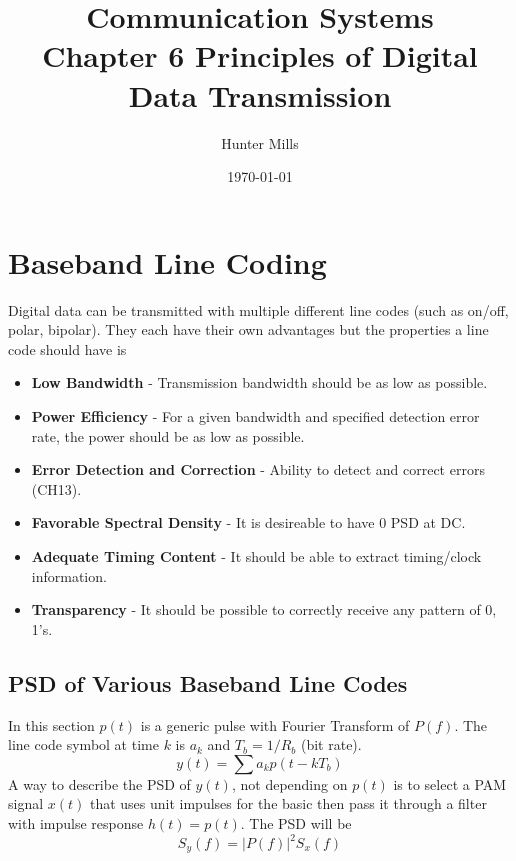 \documentclass{article}
\title{Communication Systems \\
    \large Chapter 6 Principles of Digital Data Transmission }
\author{Hunter Mills}
\date{\today}
\begin{document}
    \maketitle

    \medskip
        
    \section{Baseband Line Coding}
    Digital data can be transmitted with multiple different line codes (such as on/off, polar, bipolar). They each have their own
    advantages but the properties a line code should have is
    \begin{itemize}
        \item \textbf{Low Bandwidth}    - Transmission bandwidth should be as low as possible.
        \item \textbf{Power Efficiency} - For a given bandwidth and specified detection error rate, the power should be as low as possible.
        \item \textbf{Error Detection and Correction} - Ability to detect and correct errors (CH13).
        \item \textbf{Favorable Spectral Density} - It is desireable to have 0 PSD at DC.
        \item \textbf{Adequate Timing Content} - It should be able to extract timing/clock information.
        \item \textbf{Transparency} - It should be possible to correctly receive any pattern of 0, 1's.
   \end{itemize}
        
    \subsection{PSD of Various Baseband Line Codes}
    In this section $p(t)$ is a generic pulse with Fourier Transform of $P(f)$. The line code symbol at time $k$ is $a_k$
    and $T_b = 1/R_b$ (bit rate).
    \begin{equation}
        y(t) = \sum a_kp(t-kT_b)
    \end{equation}
    A way to describe the PSD of $y(t)$, not depending on $p(t)$ is to select a PAM signal $x(t)$ that uses unit impulses for the 
    basic then pass it through a filter with impulse response $h(t) = p(t)$. The PSD will be
    \begin{equation}
        S_y(f) = |P(f)|^2S_x(f)
    \end{equation}
\end{document}
